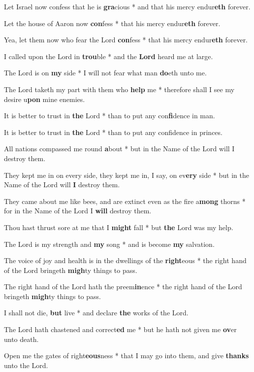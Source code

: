 \begin{multicols}{2}
	Let Israel now confess that he is \textbf{gra}cious * and that his mercy endur\textbf{eth} forever.
	
	Let the house of Aaron now \textbf{con}fess * that his mercy endur\textbf{eth} forever.
	
	Yea, let them now who fear the Lord \textbf{con}fess * that his mercy endur\textbf{eth} forever.
	
	I called upon the Lord in \textbf{trou}ble * and the \textbf{Lord} heard me at large.
	
	The Lord is on \textbf{my} side * I will not fear what man \textbf{do}eth unto me.
	
	The Lord taketh my part with them who \textbf{help} me * therefore shall I see my desire u\textbf{pon} mine enemies.
	
	It is better to trust in \textbf{the} Lord * than to put any con\textbf{fi}dence in man.
	
	It is better to trust in \textbf{the} Lord * than to put any confidence in princes.
	
	All nations compassed me round \textbf{a}bout * but in the Name of the Lord will I destroy them.
	
	They kept me in on every side, they kept me in, I say, on ev\textbf{ery} side * but in the Name of the Lord will \textbf{I} destroy them.
	
	They came about me like bees, and are extinct even as the fire a\textbf{mong} thorns * for in the Name of the Lord I \textbf{will} destroy them.
	
	Thou hast thrust sore at me that I \textbf{might} fall * but \textbf{the} Lord was my help.
	
	The Lord is my strength and \textbf{my} song * and is become \textbf{my} salvation.
	
	The voice of joy and health is in the dwellings of the \textbf{right}eous * the right hand of the Lord bringeth \textbf{migh}ty things to pass.
	
	The right hand of the Lord hath the preem\textbf{in}ence * the right hand of the Lord bringeth \textbf{migh}ty things to pass.
	
	I shall not die, \textbf{but} live * and declare \textbf{the} works of the Lord.
	
	The Lord hath chastened and correct\textbf{ed} me * but he hath not given me \textbf{ov}er unto death.
	
	Open me the gates of right\textbf{eous}ness * that I may go into them, and give \textbf{thanks} unto the Lord.
	

\end{multicols}
